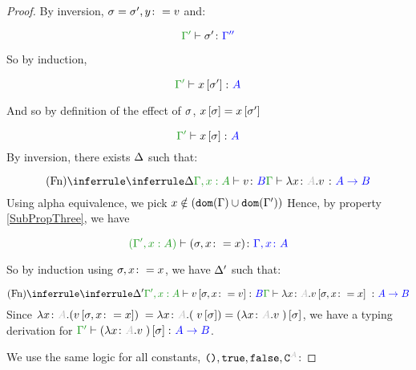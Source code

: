 \documentclass{report}
\begin{document}
\begin{framed}
\begin{proof}
                By inversion, $\sigma = \sigma', y\colon= v$
                and:
        
                \begin{equation}
                    \typerelation{\G'}{\si'}{\G''}
                \end{equation}
        
                So by induction,
        
                \begin{equation}
                    \typerelation{\G'}{x\sub{\si'}}{A}
                \end{equation}
        
                And so by definition of the effect of $\sigma$, $x\left[\sigma\right] = x\left[\sigma'\right]$
        
                \begin{equation}
                    \typerelation{\G'}{x\sub{\si}}{A}
                \end{equation}
            By inversion, there exists $\Delta$ such that:
        
            \begin{equation}
                \ntreeruleI{Fn}{
                    \treeruleI{\D}{\typerelation{\G, x:A }{v}{B}}
                }{\typerelation{\G}{\lam{x}{A}{v}}{\ab}}
            \end{equation}
            Using alpha equivalence, we pick $x\notin(\texttt{dom}(\Gamma)\cup\texttt{dom}(\Gamma'))$
            Hence, by property \ref{SubPropThree}, we have
        
            \begin{equation}
                \typerelation{(\G', x:A )}{(\si, x\setto x)}{\gax}
            \end{equation}
        
            So by induction using $\sigma, x\colon= x$, we have $\Delta'$ such that:
        
            \begin{equation}
                \ntreeruleI{Fn}{
                    \treeruleI{\D'}{\typerelation{\G', x:A }{v\sub{\si, x\setto v}}{B}}
                }{\typerelation{\G}{\lam{x}{A}{v\sub{\si, x\setto{x}}}}{\ab}}
            \end{equation} 
            Since $\lam{x}{A}{(v\sub{\si, x\setto{x}})} = {\lam{x}{A}({v\ssi})} = (\lam{x}{A}{v})\ssi$, we have a typing derivation for $\typerelation{\G'}{(\lam{x}{A}{v})\ssi}{\ab}$.
        
            We use the same logic for all constants, $\u,\t,\f,\const{A}$:
        

\end{proof}
\end{framed}
\end{document}
